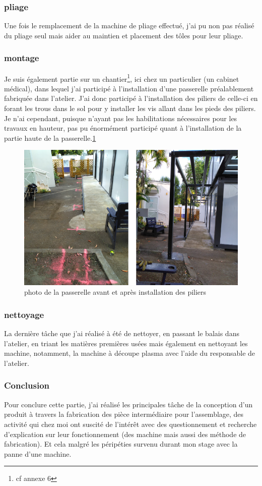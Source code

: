 \subsubsection{pliage}
Une fois le remplacement de la machine de pliage effectué, j'ai pu non pas réalisé du pliage seul mais aider au maintien et placement des tôles pour leur pliage.
\subsubsection{montage}
Je suis également partie sur un chantier\footnote{cf annexe 6}, ici chez un particulier (un cabinet médical), dans lequel j'ai participé à l'installation d'une passerelle préalablement fabriquée dans l'atelier. J'ai donc participé à l'installation des piliers de celle-ci en forant les trous dans le sol pour y installer les vis allant dans les pieds des piliers. Je n'ai cependant, puisque n'ayant pas les habilitations nécessaires pour les travaux en hauteur, pas pu énormément participé quant à l'installation de la partie haute de la passerelle.\ref{fig:pillier_passerelle}
\begin{figure}[h!]
    \centering
    \includegraphics[width=1\linewidth]{figures/pillier_passerelle.png}
    \caption{photo de la passerelle avant et après installation des piliers}
    \label{fig:pillier_passerelle}
\end{figure}
\subsubsection{nettoyage}
La dernière tâche que j'ai réalisé à été de nettoyer, en passant le balais dans l'atelier, en triant les matières premières usées mais également en nettoyant les machine, notamment, la machine à découpe plasma avec l'aide du responsable de l'atelier.


\subsubsection{Conclusion}

Pour conclure cette partie, j'ai réalisé les principales tâche de la conception d'un produit à travers la fabrication des pièce intermédiaire pour l'assemblage, des activité qui chez moi ont suscité de l'intérêt avec des questionnement et recherche d'explication sur leur fonctionnement (des machine mais aussi des méthode de fabrication). Et cela malgré les péripéties survenu durant mon stage avec la panne d'une machine.
